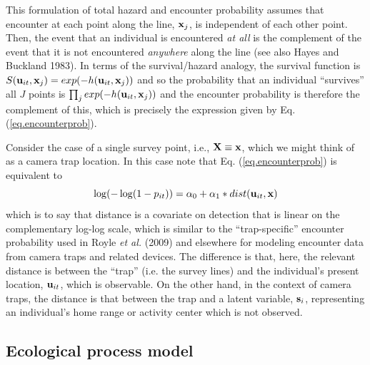 This formulation of total hazard and encounter probability assumes
that encounter at each point along the line, ${\bf x}_{j}$, is
independent of each other point. Then, the event that an individual is
encountered {\it at all} is the complement of the event that it is not
encountered {\it anywhere} along the line (see also Hayes and Buckland
1983).  In terms of the survival/hazard analogy, the survival function
is $S({\bf u}_{it},{\bf x}_{j}) = exp(-h({\bf u}_{it},{\bf x}_{j}))$
and so the probability that an individual ``survives'' all $J$ points
is $\prod_{j} exp(-h({\bf u}_{it},{\bf x}_{j}))$ and the encounter
probability is therefore the complement of this, which is precisely
the expression given by Eq. (\ref{eq.encounterprob}).

Consider the case of a single survey point, i.e., ${\bf X} \equiv {\bf
  x}$, which we might think of as a camera trap location.  In this
case note that Eq. (\ref{eq.encounterprob}) is equivalent to
\[
\log(-\log(1-p_{it})) = \alpha_{0} + \alpha_{1}*dist( {\bf u}_{it},{\bf x})
\]
which is to say that distance is a covariate on detection that is
linear on the complementary log-log scale, which is similar to the
``trap-specific'' encounter probability used in Royle {\it et al.}
(2009) and elsewhere for modeling encounter data from camera traps and
related devices. The difference is that, here, the relevant distance
is between the ``trap'' (i.e. the survey lines) and the individual's
present location, ${\bf u}_{it}$, which is observable. On the other
hand, in the context of camera traps, the distance is that between the
trap and a latent variable, ${\bf s}_{i}$, representing an
individual's home range or activity center which is not observed.





\subsection{Ecological process model } 

